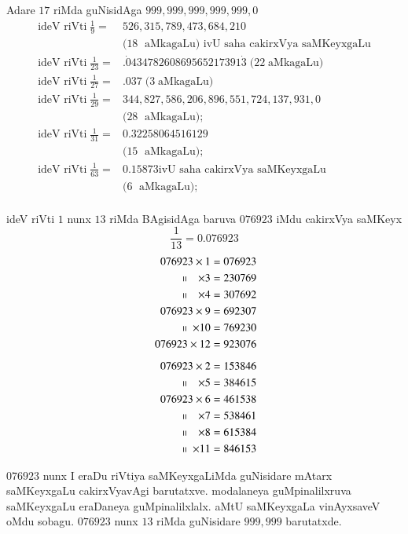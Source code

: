 Adare $17$ riMda guNisidAga $999,999,999,999,999,0$
\begin{align*}
\text{ideV riVti} \;\frac{1}{9} =& 526, 315, 789, 473, 684, 210\\
&(18\; \text{ aMkagaLu)  ivU saha cakirxVya saMKeyxgaLu}\\[0.1cm]
\text{ideV riVti}\; \frac{1}{23} = & .{\dot 0}43478260869565217391{\dot 3}\; (22 \;\text{aMkagaLu)}\\
\text{ideV riVti} \;\frac{1}{27} = & .037 \;(3 \;\text{aMkagaLu)}\\
\text{ideV riVti} \;\frac{1}{29} = & 344,827,586,206,896,551,724,137,931,0\\
&(28\; \text{ aMkagaLu)};\\
\text{ideV riVti} \;\frac{1}{31}=& 0.32258064516129\\
&(15\; \text{ aMkagaLu)};\\
\text{ideV riVti}\;\frac{1}{63}=& 0.15873 \text{ivU saha cakirxVya saMKeyxgaLu}\\
 &(6\; \text{ aMkagaLu)};\\
\end{align*}


ideV riVti $1$ nunx $13$ riMda BAgisidAga baruva $076923$ iMdu cakirxVya saMKeyx
$$
\frac{1}{13} = 0.076923
$$
\begin{align*}
076923 \times 1 &= 076923 \\
~~~~~~~~~\shortparallel ~~~\times 3 &= 230769 \\ 
~~~~~~~~~\shortparallel ~~~\times 4 &= 307692 \\
076923\times 9 &= 692307 \\ 
~~~~~~~~~~~\shortparallel ~\times 10 &= 769230 \\
076923\times 12 &= 923076\\[5pt] 
076923 \times 2 &= 153846 \\
~~~~~~~~~\shortparallel ~~~\times 5 &= 384615 \\
076923   \times 6 &= 461538 \\
~~~~~~~~~\shortparallel ~~~\times 7 &= 538461 \\
~~~~~~~~~\shortparallel ~~~\times 8 &= 615384 \\
~~~~~~~~~~~\shortparallel ~\times 11 &= 846153 
\end{align*}

$076923$ nunx  I eraDu riVtiya saMKeyxgaLiMda guNisidare mAtarx saMKeyxgaLu cakirxVyavAgi barutatxve. modalaneya guMpinalilxruva saMKeyxgaLu eraDaneya guMpinalilxlalx. aMtU saMKeyxgaLa vinAyxsaveV oMdu sobagu. $076923$ nunx $13$ riMda guNisidare $999,999$ barutatxde.
